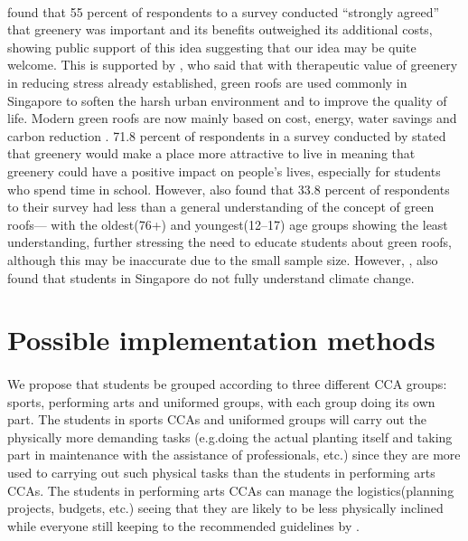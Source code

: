 \documentclass{article}
\begin{document}
\begin{multicols}{2}
  \paragraph{}  found that 55 percent of respondents
  to a survey conducted “strongly agreed” that greenery was important
  and its benefits outweighed its additional costs, showing public support
  of this idea suggesting that our idea may be quite welcome. This is
  supported by , who said that with therapeutic value of
  greenery in reducing stress already established, green roofs are used
  commonly in Singapore to soften the harsh urban environment and to
  improve the quality of life. Modern green roofs are now mainly based on
  cost, energy, water savings and carbon reduction .  71.8
  percent of respondents in a survey conducted by 
  stated that greenery would make a place more attractive to live in
  meaning that greenery could have a positive impact on people’s
  lives, especially for students who spend time in school. However,
   also found that 33.8 percent of respondents to
  their survey had less than a general understanding of the concept of
  green roofs--- with the oldest(76+) and youngest(12--17) age groups
  showing the least understanding, further stressing the need to educate
  students about green roofs, although this may be inaccurate due to
  the small sample size. However, , also
  found that students in Singapore do not fully understand climate change.



  \section{Possible implementation methods}
  \paragraph{} We propose that students be grouped according to three
  different CCA groups: sports, performing arts and uniformed groups,
  with each group doing its own part. The students in sports CCAs
  and uniformed groups will carry out the physically more demanding
  tasks (e.g.doing the actual planting itself and taking part in
  maintenance with the assistance of professionals, etc.) since they
  are more used to carrying out such physical tasks than the students in
  performing arts CCAs. The students in performing arts CCAs can manage
  the logistics(planning projects, budgets, etc.) seeing that they are
  likely to be less physically inclined while everyone still keeping to
  the recommended guidelines by .




\end{multicols}
\end{document}

